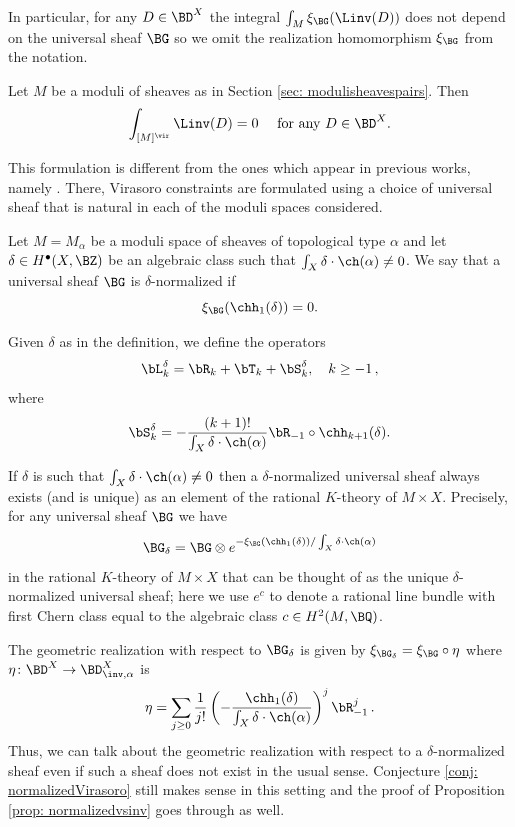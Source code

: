 In particular, for any $D\in \BD^X$ the integral $\int_M \xi_{\BG}(\Linv(D))$ does not depend on the universal sheaf $\BG$ so we omit the realization homomorphism $\xi_{\BG}$ from the notation.

\begin{conjecture}
\notready\label{conj: invVirasoro}
Let $M$ be a moduli of sheaves as in Section \ref{sec: modulisheavespairs}. Then
\[\int_{[M]^\vir} \Linv(D)=0\quad \textup{ for any }D\in \BD^X.\]
\end{conjecture}

This formulation is different from the ones which appear in previous works, namely \cite{moop,moreira,bree}. There, Virasoro constraints are formulated using a choice of universal sheaf that is natural in each of the moduli spaces considered.

\begin{definition}
\notready
\label{def:delta-normalized-universal-sheaf}
Let $M=M_\alpha$ be a moduli space of sheaves of topological type $\alpha$ and let $\delta\in H^\bullet(X, \BZ)$ be an algebraic class such that $\int_X  \delta\cdot \ch(\alpha) \neq 0$. We say that a universal sheaf $\BG$ is $\delta$-normalized if
\begin{equation}\label{Eq:deltanorm}\xi_\BG(\chh_1(\delta))=0.\end{equation}
\end{definition}

Given $\delta$ as in the definition, we define the operators
\[\bL^\delta_k=\bR_k+\bT_k+\bS_k^\delta,\quad k\geq -1\,,\]
where
\[\bS_k^\delta=-\frac{(k+1)!}{\int_X \delta\cdot \ch(\alpha)}\bR_{-1}\circ \chh_{k+1}(\delta).\]

\begin{remark}
\notready\label{rem: rationaldeltanormalized}
If $\delta$ is such that $\int_X  \delta\cdot \ch(\alpha)\neq 0$ then a $\delta$-normalized universal sheaf always exists (and is unique) as an element of the rational $K$-theory of $M\times X$. Precisely, for any universal sheaf $\BG$ we have
\[\BG_\delta=\BG\otimes e^{-\xi_\BG(\chh_1(\delta))/\int_X \delta\cdot \ch(\alpha)}\]
in the rational $K$-theory of $M\times X$ that can be thought of as the unique $\delta$-normalized universal sheaf; here we use $e^{c}$ to denote a rational line bundle with first Chern class equal to the algebraic class $c\in H^2(M, \BQ)$.

The geometric realization with respect to $\BG_\delta$ is given by $\xi_{\BG_\delta}=\xi_{\BG}\circ \eta$ where $\eta\colon \BD^X\to \BD^X_{\inv,\alpha}$ is
\[\eta=\sum_{j\geq 0}\frac{1}{j!}\left(-\frac{\chh_1(\delta)}{\int_X \delta\cdot \ch(\alpha)}\right)^j\bR_{-1}^j\,.\]
Thus, we can talk about the geometric realization with respect to a $\delta$-normalized sheaf even if such a sheaf does not exist in the usual sense. Conjecture \ref{conj: normalizedVirasoro} still makes sense in this setting and the proof of Proposition \ref{prop: normalizedvsinv} goes through as well.
\end{remark}

